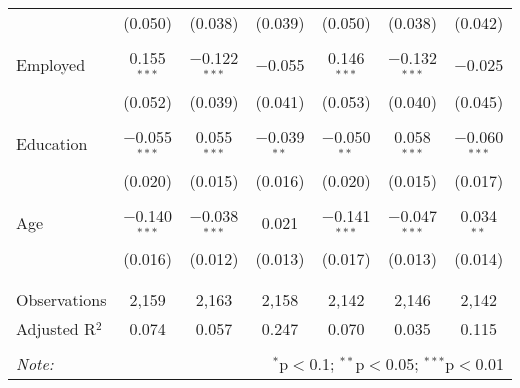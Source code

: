 \begin{table}[!htbp]
\begin{tabular}{@{\extracolsep{5pt}}lcccccc}
  & (0.050) & (0.038) & (0.039) & (0.050) & (0.038) & (0.042) \\ 
  & & & & & & \\ 
 Employed & 0.155$^{***}$ & $-$0.122$^{***}$ & $-$0.055 & 0.146$^{***}$ & $-$0.132$^{***}$ & $-$0.025 \\ 
  & (0.052) & (0.039) & (0.041) & (0.053) & (0.040) & (0.045) \\ 
  & & & & & & \\ 
 Education & $-$0.055$^{***}$ & 0.055$^{***}$ & $-$0.039$^{**}$ & $-$0.050$^{**}$ & 0.058$^{***}$ & $-$0.060$^{***}$ \\ 
  & (0.020) & (0.015) & (0.016) & (0.020) & (0.015) & (0.017) \\ 
  & & & & & & \\ 
 Age & $-$0.140$^{***}$ & $-$0.038$^{***}$ & 0.021 & $-$0.141$^{***}$ & $-$0.047$^{***}$ & 0.034$^{**}$ \\ 
  & (0.016) & (0.012) & (0.013) & (0.017) & (0.013) & (0.014) \\ 
  & & & & & & \\ 
\hline \\[-1.8ex] 
Observations & 2,159 & 2,163 & 2,158 & 2,142 & 2,146 & 2,142 \\ 
Adjusted R$^{2}$ & 0.074 & 0.057 & 0.247 & 0.070 & 0.035 & 0.115 \\ 
\hline 
\hline \\[-1.8ex] 
\textit{Note:}  & \multicolumn{6}{r}{$^{*}$p$<$0.1; $^{**}$p$<$0.05; $^{***}$p$<$0.01} \\ 
\end{tabular} 
\end{table} 
